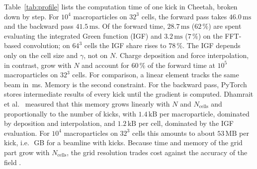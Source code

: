 \label{sec:intro-cost}
Table~\ref{tab:profile} lists the computation time of one kick in
Cheetah, broken down by step. For $10^4$ macroparticles on $32^3$ cells,
the forward pass takes $46.0\,\mathrm{ms}$ and the backward pass
$41.5\,\mathrm{ms}$. Of the forward time, $28.7\,\mathrm{ms}$ ($62\,\%$)
are spent evaluating the integrated Green function (IGF) and
$3.2\,\mathrm{ms}$ ($7\,\%$) on the FFT-based convolution; on $64^3$ cells
the IGF share rises to $78\,\%$. The IGF depends only on the cell size and
$\gamma$, not on $N$. Charge deposition and force interpolation, in
contrast, grow with $N$ and account for $60\,\%$ of the forward time at
$10^5$ macroparticles on $32^3$ cells. For comparison, a linear element
tracks the same beam in \,ms.
Memory is the second constraint. For the backward pass, PyTorch stores
intermediate results of every kick until the gradient is computed.
Dhamrait et al.~\cite{dhamrait2026memory} measured that this memory grows
linearly with $N$ and $N_\mathrm{cells}$ and proportionally to the number of
kicks, with $1.4\,\mathrm{kB}$ per macroparticle, dominated by deposition
and interpolation, and $1.2\,\mathrm{kB}$ per cell, dominated by the IGF
evaluation. For $10^4$ macroparticles on $32^3$ cells this amounts to
about $53\,\mathrm{MB}$ per kick, i.e.\ \,GB for a beamline with
 kicks. Because time and memory of the grid part grow with
$N_\mathrm{cells}$, the grid resolution trades cost against the accuracy
of the field .

